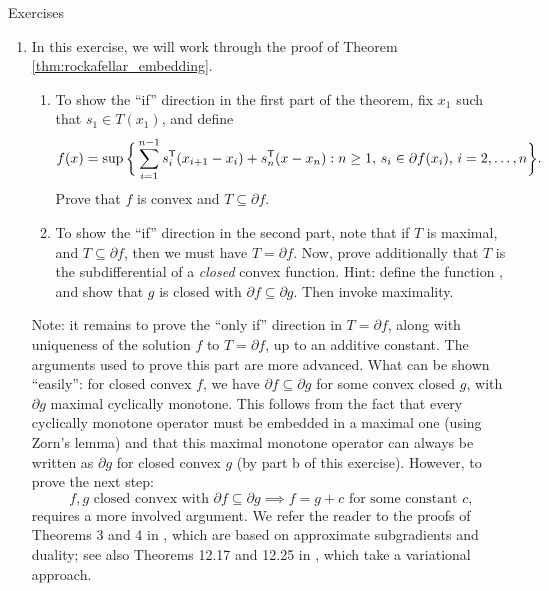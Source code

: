 \begin{xcb}{Exercises}
\begin{enumerate}[label=\thechapter.\arabic*]
\item \label{ex:rockafellar_embedding}
  In this exercise, we will work through the proof of Theorem
  \ref{thm:rockafellar_embedding}. 

\begin{enumerate}[label=\alph*.]
\item To show the ``if'' direction in the first part of the theorem, fix $x_1$
  such that $s_1 \in T(x_1)$, and define   
  \[
  f(x) = \sup\bigg\{ \sum_{i=1}^{n-1} s_i^{\mathsf{T}} (x_{i+1} - x_i) + s_n^{\mathsf{T}} (x - x_n)
  : \text{$n \geq 1$, $s_i \in \partial f(x_i)$, $i=2,\dots,n$} \bigg\}.
  \]
  Prove that $f$ is convex and $T \subseteq \partial f$.

\item To show the ``if'' direction in the second part, note that if $T$ is
  maximal, and $T \subseteq \partial f$, then we must have $T = \partial 
  f$. Now, prove additionally that $T$ is the subdifferential of a \emph{closed} 
  convex function. Hint: define the function , and show that $g$ is closed with $\partial f \subseteq \partial
  g$. Then invoke maximality.      
\end{enumerate}

\smallskip
Note: it remains to prove the ``only if'' direction in $T = \partial f$, along
with uniqueness of the solution $f$ to $T = \partial f$, up to an additive
constant. The arguments used to prove this part are more advanced. What can be 
shown ``easily'': for closed convex $f$, we have $\partial f \subseteq \partial
g$ for some convex closed $g$, with $\partial g$ maximal cyclically
monotone. This follows from the fact that every cyclically monotone operator
must be embedded in a maximal one (using Zorn's lemma) and that this maximal
monotone operator can always be written as $\partial g$ for closed convex $g$
(by part b of this exercise). However, to prove the next step:  
\begin{equation} 
\label{eq:embedding_equality}
\text{$f,g$ closed convex with $\partial f \subseteq \partial g$} \implies 
\text{$f = g + c$ for some constant $c$},
\end{equation} 
requires a more involved argument. We refer the reader to the proofs of Theorems
3 and 4 in \cite{rockafellar1966characterization}, which are based on
approximate subgradients and duality; see also Theorems 12.17 and 12.25 in   
\cite{rockafellar2009variational}, which take a variational approach.      


\end{enumerate}
\end{xcb}
